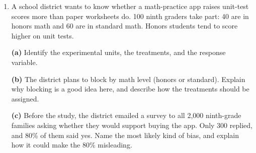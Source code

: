 \documentclass[12pt]{article}
\begin{document}
\vspace{0.06in}

\begin{enumerate}[leftmargin=1.9em, itemsep=0.10in, resume]

  \item A school district wants to know whether a math-practice app raises unit-test scores
        more than paper worksheets do. 100 ninth graders take part: 40 are in honors math and
        60 are in standard math. Honors students tend to score higher on unit tests.

        \vspace{6pt}

        \boxguard[30]
        \textbf{(a)} Identify the experimental units, the treatments, and the response
        variable.\\[4pt]

        \vspace{4pt}
        \boxguard[30]
        \textbf{(b)} The district plans to block by math level (honors or standard). Explain why
        blocking is a good idea here, and describe how the treatments should be assigned.\\[4pt]

        \vspace{4pt}
        \boxguard[30]
        \textbf{(c)} Before the study, the district emailed a survey to all 2{,}000 ninth-grade
        families asking whether they would support buying the app. Only 300 replied, and 80\%
        of them said yes. Name the most likely kind of bias, and explain how it could make the
        80\% misleading.\\[4pt]

\end{enumerate}
\end{document}
